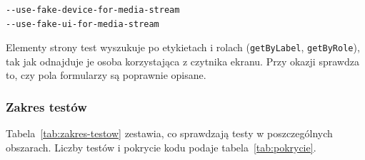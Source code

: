 \begin{small}
\begin{verbatim}
--use-fake-device-for-media-stream
--use-fake-ui-for-media-stream
\end{verbatim}
\end{small}

\noindent Elementy strony test wyszukuje po etykietach i rolach
(\texttt{getByLabel}, \texttt{getByRole}), tak jak odnajduje je osoba
korzystająca z czytnika ekranu. Przy okazji sprawdza to, czy pola formularzy
są poprawnie opisane.

\subsubsection{Zakres testów}

Tabela~\ref{tab:zakres-testow} zestawia, co sprawdzają testy w poszczególnych
obszarach. Liczby testów i pokrycie kodu podaje tabela~\ref{tab:pokrycie}.

